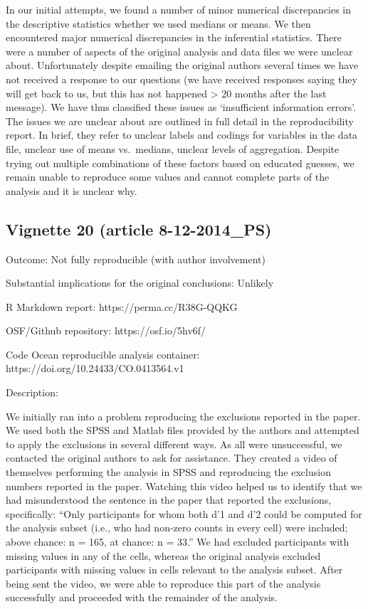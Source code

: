 \documentclass[english,,man,floatsintext]{apa6}
\begin{document}
\begin{appendix}
In our initial attempts, we found a number of minor numerical
discrepancies in the descriptive statistics whether we used medians or
means. We then encountered major numerical discrepancies in the
inferential statistics. There were a number of aspects of the original
analysis and data files we were unclear about. Unfortunately despite
emailing the original authors several times we have not received a
response to our questions (we have received responses saying they will
get back to us, but this has not happened \textgreater{} 20 months after
the last message). We have thus classified these issues as `insufficient
information errors'. The issues we are unclear about are outlined in
full detail in the reproducibility report. In brief, they refer to
unclear labels and codings for variables in the data file, unclear use
of means vs.~medians, unclear levels of aggregation. Despite trying out
multiple combinations of these factors based on educated guesses, we
remain unable to reproduce some values and cannot complete parts of the
analysis and it is unclear why.

\hypertarget{vignette-20-article-8-12-2014_ps}{%
\subsection{Vignette 20 (article
8-12-2014\_PS)}\label{vignette-20-article-8-12-2014_ps}}

Outcome: Not fully reproducible (with author involvement)

Substantial implications for the original conclusions: Unlikely

R Markdown report: https://perma.cc/R38G-QQKG

OSF/Github repository: https://osf.io/5hv6f/

Code Ocean reproducible analysis container:
https://doi.org/10.24433/CO.0413564.v1

Description:

We initially ran into a problem reproducing the exclusions reported in
the paper. We used both the SPSS and Matlab files provided by the
authors and attempted to apply the exclusions in several different ways.
As all were unsuccessful, we contacted the original authors to ask for
assistance. They created a video of themselves performing the analysis
in SPSS and reproducing the exclusion numbers reported in the paper.
Watching this video helped us to identify that we had misunderstood the
sentence in the paper that reported the exclusions, specifically: ``Only
participants for whom both d'1 and d'2 could be computed for the
analysis subset (i.e., who had non-zero counts in every cell) were
included; above chance: n = 165, at chance: n = 33.'' We had excluded
participants with missing values in any of the cells, whereas the
original analysis excluded participants with missing values in cells
relevant to the analysis subset. After being sent the video, we were
able to reproduce this part of the analysis successfully and proceeded
with the remainder of the analysis.


\end{appendix}
\end{document}
